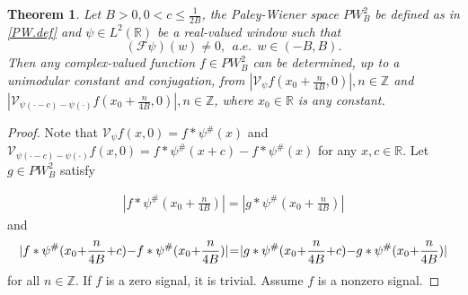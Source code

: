 \documentclass[12pt,oneside,reqno]{amsart}
\newtheorem{theorem}{Theorem}[section]
\newcommand{\Z}{\mathbb{Z}}
\newcommand{\R}{\mathbb{R}}
\numberwithin{equation}{section}
\begin{document}
\begin{theorem}\label{thm4}
	Let $B>0, 0<c\le \frac{1}{2B}$, the Paley-Wiener space $PW_B^2$ be defined as in \eqref{PW.def} and $\psi\in L^2(\R)$ be a real-valued window such that
	\begin{equation}\label{eq03}
		(\mathcal{F} \psi) (w) \ne 0 ,  \ \ a.e. \ \  w \in (-B,B).
	\end{equation}
	Then any complex-valued function $f\in PW_B^2$ can be determined, up to a unimodular constant and conjugation, from $ |\mathcal{V}_{\psi} f (x_0+\frac{n}{4B},0)|, n\in \Z $ and $ |\mathcal{V}_{\psi(\cdot-c)-\psi(\cdot)} f (x_0+\frac{n}{4B},0)|, n\in \Z  $, where $x_0\in \R$ is any constant.
\end{theorem}
\begin{proof}
	Note that $\mathcal{V}_{\psi} f(x,0) = f\ast \psi^\# (x)$ and $\mathcal{V}_{\psi(\cdot-c)-\psi(\cdot)} f(x,0) = f\ast \psi^\# (x+c) - f\ast \psi^\# (x)$ for any $x,c\in \R$.
	Let $g\in PW_B^2$ satisfy
	
	\begin{align}\label{eq01}
		|f\ast \psi^\# (x_0 + \frac{n}{4B})| = |g\ast \psi^\# (x_0+\frac{n}{4B})|
	\end{align}
	and
	\begin{align}\label{eq02}
		|f\ast \psi^\# (x_0 \hskip-.03in + \hskip-.03in \frac{n}{4B} \hskip-.03in + \hskip-.03in c) \hskip-.03in - \hskip-.03in f\ast \psi^\# (x_0 \hskip-.03in + \hskip-.03in \frac{n}{4B})| \hskip-.03in = \hskip-.03in |g\ast \psi^\# (x_0 \hskip-.03in + \hskip-.03in \frac{n}{4B} \hskip-.03in + \hskip-.03in c) \hskip-.03in - \hskip-.03in g\ast \psi^\# (x_0 \hskip-.03in + \hskip-.03in \frac{n}{4B})|
	\end{align}
	for all $n\in \Z$.
	If $f$ is a  zero signal, it is trivial. Assume $f$ is a nonzero signal. 
	
	

\end{proof}
\end{document}
